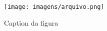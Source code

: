 


\begin{figure}[H]
  \begin{center}
    \caption{Caption da figura}
    \label{fig:xxx}
       \texttt{[image: imagens/arquivo.png]}
  \end{center}
\end{figure}
